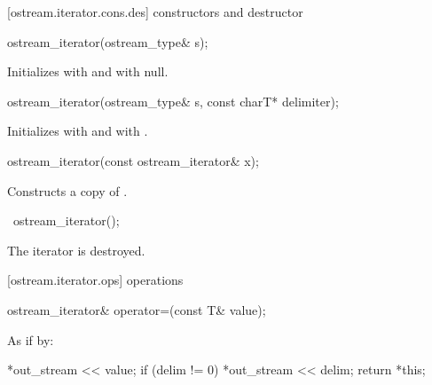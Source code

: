 [ostream.iterator.cons.des]{ constructors and destructor}


%
\begin{itemdecl}
ostream_iterator(ostream_type& s);
\end{itemdecl}

\begin{itemdescr}
\pnum
\effects
Initializes  with  and
 with null.
\end{itemdescr}


%
\begin{itemdecl}
ostream_iterator(ostream_type& s, const charT* delimiter);
\end{itemdecl}

\begin{itemdescr}
\pnum
\effects
Initializes  with  and
 with .
\end{itemdescr}


%
\begin{itemdecl}
ostream_iterator(const ostream_iterator& x);
\end{itemdecl}

\begin{itemdescr}
\pnum
\effects
Constructs a copy of .
\end{itemdescr}

%
\begin{itemdecl}
~ostream_iterator();
\end{itemdecl}

\begin{itemdescr}
\pnum
\effects
The iterator is destroyed.
\end{itemdescr}

[ostream.iterator.ops]{ operations}

%
\begin{itemdecl}
ostream_iterator& operator=(const T& value);
\end{itemdecl}

\begin{itemdescr}
\pnum
\effects
As if by:
\begin{codeblock}
*out_stream << value;
if (delim != 0)
  *out_stream << delim;
return *this;
\end{codeblock}
\end{itemdescr}


